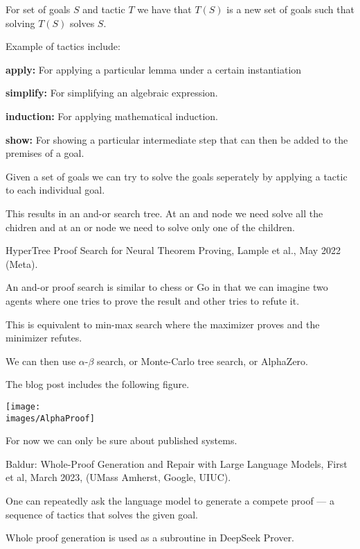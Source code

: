 {\vfill
For set of goals $S$ and tactic $T$ we have that $T(S)$ is a new set of goals such that solving $T(S)$ solves $S$.

\vfill
Example of tactics include:

\vfill
{\bf apply:} For applying a particular lemma under a certain instantiation

\vfill
{\bf simplify:} For simplifying an algebraic expression.

\vfill
{\bf induction:} For applying mathematical induction.

\vfill
{\bf show:} For showing a particular intermediate step that can then be added to the premises of a goal.


Given a set of goals we can try to solve the goals seperately by applying a tactic to each individual goal.

\vfill
This results in an and-or search tree.  At an and node we need solve all the chidren and at an or node we need to
solve only one of the children.

\vfill
HyperTree Proof Search for Neural Theorem Proving, Lample et al., May 2022 (Meta).



An and-or proof search is similar to chess or Go in that we can imagine two agents where one tries to prove the result and other tries to refute it.

\vfill
This is equivalent to min-max search where the maximizer proves and the minimizer refutes.

\vfill
We can then use $\alpha$-$\beta$ search, or Monte-Carlo tree search, or AlphaZero.


The blog post includes the following figure.

\centerline{\texttt{[image: \\images/AlphaProof]}}

\vfill
For now we can only be sure about published systems.


Baldur: Whole-Proof Generation and Repair with Large Language Models, First et al, March 2023, (UMass Amherst, Google, UIUC).

\vfill
One can repeatedly ask the language model to generate
a compete proof --- a sequence of tactics that solves the given goal.

\vfill
Whole proof generation is used as a subroutine in DeepSeek Prover.

}
